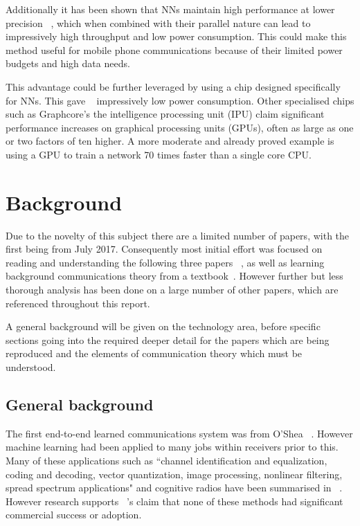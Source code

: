 \documentclass[12pt,onecolumn,letterpaper]{article}
\begin{document}
Additionally it has been shown that NNs maintain high performance at lower precision ~\cite{NnLowFp}, which when combined with their parallel nature can lead to impressively high throughput and low power consumption. This could make this method useful for mobile phone communications because of their limited power budgets and high data needs.

This advantage could be further leveraged by using a chip designed specifically for NNs. This gave ~\cite{Eyeriss} impressively low power consumption. Other specialised chips such as Graphcore's the intelligence processing unit (IPU) claim significant performance increases on graphical processing units (GPUs), often as large as one or two factors of ten higher. A more moderate and already proved example is \cite{GpuIncreasedThroughput} using a GPU to train a network 70 times faster than a single core CPU.

\FloatBarrier
\section{Background}

Due to the novelty of this subject there are a limited number of papers, with the first being from July 2017. Consequently most initial effort was focused on reading and understanding the following three papers ~\cite{oShea, Clerkx, Aoudia}, as well as learning background communications theory from a textbook~\cite{WirelessTextbookC2}. However further but less thorough analysis has been done on a large number of other papers, which are referenced throughout this report. 

A general background will be given on the technology area, before specific sections going into the required deeper detail for the papers which are being reproduced and the elements of communication theory which must be understood.

\subsection{General background}

The first end-to-end learned communications system was from O'Shea \etal ~\cite{oShea,oShea0}. However machine learning had been applied to many jobs within receivers prior to this. Many of these applications such as ``channel identification and equalization, coding and decoding, vector quantization, image processing, nonlinear filtering, spread spectrum applications" and cognitive radios have been summarised in ~\cite{AppsOfNnToComms, AppsNnToCognitiveRadios}. However research supports ~\cite{oShea}'s claim that none of these methods had significant commercial success or adoption.
\end{document}
